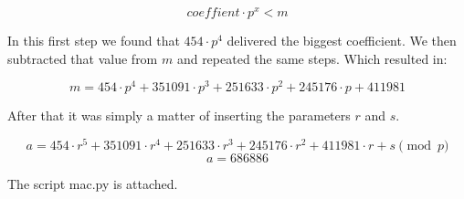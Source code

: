 \documentclass{article}
\begin{document}
\[ coeffient \cdot p^x < m \]

In this first step we found that $454 \cdot p^4$ delivered the biggest coefficient.
We then subtracted that value from $m$ and repeated the same steps. Which resulted in:

\[ m = 454 \cdot p^4 + 351091 \cdot p^3 + 251633 \cdot p^2 + 245176 \cdot p + 411981 \]

After that it was simply a matter of inserting the parameters $r$ and $s$.

\[ a = 454 \cdot r^5 + 351091 \cdot r^4 + 251633 \cdot r^3 + 245176 \cdot r^2 + 411981 \cdot r + s \pmod p \]
\[ a = 686886 \]



The script mac.py is attached.



 
\end{document}
